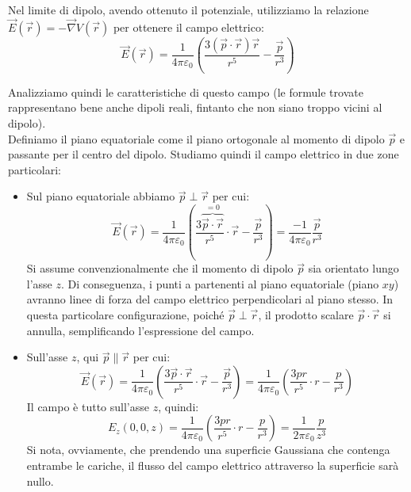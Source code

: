 \documentclass{book}
\begin{document}
Nel limite di dipolo, avendo ottenuto il potenziale, utilizziamo la relazione $\vec{E}(\vec{r})=-\vec{\nabla}V(\vec{r})$ per ottenere il campo elettrico:
\begin{equation*}
\vec{E}(\vec{r})= \frac{1}{4\pi\varepsilon_0} (\frac{3(\vec{p} \cdot \vec{r})\vec{r}}{r^5} -\frac{\vec{p}}{r^3})
\end{equation*}

Analizziamo quindi le caratteristiche di questo campo (le formule trovate rappresentano bene anche dipoli reali, fintanto che non siano troppo vicini al dipolo).\\
Definiamo il piano equatoriale come il piano ortogonale al momento di dipolo $\vec{p}$ e passante per il centro del dipolo. Studiamo quindi il campo elettrico in due zone particolari:
\begin{itemize}
    \item Sul piano equatoriale abbiamo $\vec{p}\perp\vec{r}$ per cui:
    \begin{equation*}
    \vec{E}(\vec{r}) = \frac{1}{4\pi \varepsilon_0}\left( \frac{3\overbrace{\vec{p}\cdot \vec{r}}^{=0}}{r^5}\cdot\vec{r} -\frac{\vec{p}}{r^3} \right) =\frac{-1}{4\pi\varepsilon_0}\frac{\vec{p}}{r^3}
    \end{equation*}
    \noindent Si assume convenzionalmente che il momento di dipolo $\vec{p}$ sia orientato lungo l'asse $z$. Di conseguenza, i punti a partenenti al piano equatoriale (piano $xy$) avranno linee di forza del campo elettrico perpendicolari al piano stesso. In questa particolare configurazione, poiché $\vec{p} \perp \vec{r}$, il prodotto scalare $\vec{p} \cdot \vec{r}$ si annulla, semplificando l'espressione del campo.
    \item Sull'asse $z$, qui $\vec{p}\parallel\vec{r}$ per cui:
    \begin{equation*}
    \vec{E}(\vec{r})= \frac{1}{4\pi \varepsilon_0}\left( \frac{3\vec{p}\cdot \vec{r}}{r^5}\cdot\vec{r} -\frac{\vec{p}}{r^3}\right) = \frac{1}{4\pi\varepsilon_0}  \left( \frac{3p r}{r^5}\cdot r -\frac{p}{r^3} \right)
    \end{equation*}
    \noindent Il campo \`e tutto sull'asse $z$, quindi:
    \begin{equation*}
    E_z(0,0,z) = \frac{1}{4\pi\varepsilon_0}  \left( \frac{3p r}{r^5}\cdot r -\frac{p}{r^3} \right) = \frac{1}{2\pi\varepsilon_0} \frac{p}{z^3}    
    \end{equation*}
    Si nota, ovviamente, che prendendo una superficie Gaussiana che contenga entrambe le cariche, il flusso del campo elettrico attraverso la superficie sar\`a nullo.
\end{itemize}
\end{document}
